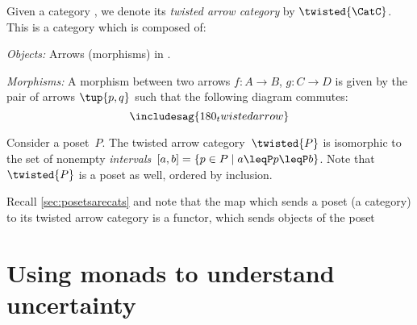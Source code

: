 




\begin{ctdefinition}
  Given a category \CatC, we denote its \emph{twisted arrow category} by $\twisted{\CatC}$. This is a category which is composed of:
  \begin{compactenum}
    \item \emph{Objects:} Arrows (morphisms) in \CatC.
    \item \emph{Morphisms:} A morphism between two arrows $f\colon A\to B$, $g\colon C\to D$ is given by the pair of arrows $\tup{p,q}$ such that the following diagram commutes:
    \begin{equation}
      \includesag{180_twistedarrow}
    \end{equation}
  \end{compactenum}
\end{ctdefinition}

\begin{example}[Intervals]
  Consider a poset~$P$. The twisted arrow category~$\twisted{P}$ is isomorphic to the set of nonempty \emph{intervals}~$[a,b]=\{p \in P\mid a\leqP p \leqP b\}$. Note that~$\twisted{P}$ is a poset as well, ordered by inclusion.
\end{example}
\begin{remark}
  Recall \cref{sec:posetsarecats} and note that the map which sends a poset (a category) to its twisted arrow category is a functor, which sends objects of the poset
\end{remark}


\section{Using monads to understand uncertainty}

